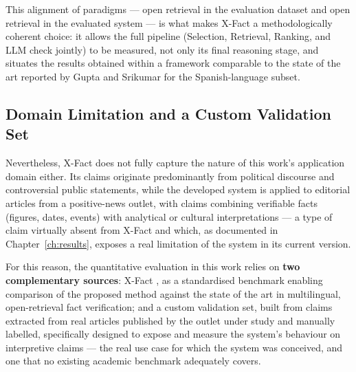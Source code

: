 This alignment of paradigms --- open retrieval in the evaluation
dataset and open retrieval in the evaluated system --- is what makes
X-Fact a methodologically coherent choice: it allows the full
pipeline (Selection, Retrieval, Ranking, and LLM check jointly) to be
measured, not only its final reasoning stage, and situates the
results obtained within a framework comparable to the state of the
art reported by Gupta and Srikumar \cite{gupta2021xfact} for the
Spanish-language subset.

\subsection{Domain Limitation and a Custom Validation Set}
\label{subsec:custom-gold-set}

Nevertheless, X-Fact does not fully capture the nature of this
work's application domain either. Its claims originate predominantly
from political discourse and controversial public statements, while
the developed system is applied to editorial articles from a
positive-news outlet, with claims combining verifiable facts
(figures, dates, events) with analytical or cultural
interpretations --- a type of claim virtually absent from X-Fact and
which, as documented in Chapter~\ref{ch:results}, exposes a real
limitation of the system in its current version.

For this reason, the quantitative evaluation in this work relies on
\textbf{two complementary sources}: X-Fact \cite{gupta2021xfact}, as
a standardised benchmark enabling comparison of the proposed method
against the state of the art in multilingual, open-retrieval fact
verification; and a custom validation set, built from claims
extracted from real articles published by the outlet under study and
manually labelled, specifically designed to expose and measure the
system's behaviour on interpretive claims --- the real use case for
which the system was conceived, and one that no existing academic
benchmark adequately covers.

